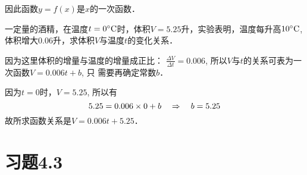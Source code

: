 因此函数$y=f(x)$是$x$的一次函数．    

\begin{example}
    一定量的酒精，在温度$t=0^{\circ}{\rm C}$时，体积$V=5.25$升，实验表明，温度每升高$10^{\circ}{\rm C}$, 体积增大0.06升，求体积$V$与温度$t$的变化关系．
\end{example}    

\begin{solution}
因为这里体积的增量与温度的增量成正比：
$\frac{\Delta V}{\Delta t}= 0.006$, 所以$V$与$t$的关系可表为一次函数$V=0.006t+b$, 只
    需要再确定常数$b$．

    因为$t=0$时，$V=5.25$, 所以有
   \[ 5.25=0.006\times 0+b\quad \Rightarrow\quad b=5.25\]
   故所求函数关系是$V=0.006t+5.25$．
\end{solution}


\section*{习题4.3}
